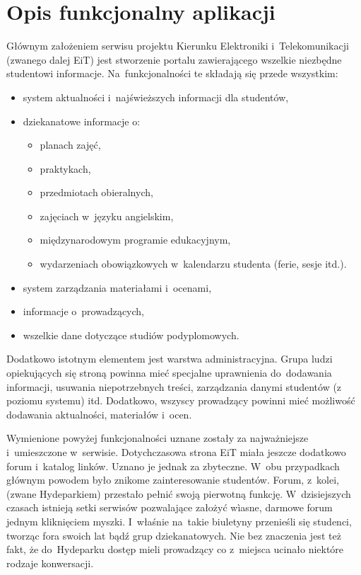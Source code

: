 \documentclass[a4paper,12pt,oneside]{report}
\begin{document}
\section{Opis funkcjonalny aplikacji}
\label{sec:funkcjonalny}
Głównym założeniem serwisu projektu Kierunku Elektroniki i~Telekomunikacji (zwanego dalej EiT) jest stworzenie portalu zawierającego wszelkie niezbędne studentowi informacje. Na~funkcjonalności te składają się przede wszystkim:
\begin{itemize}
  \item system aktualności i~najświeższych informacji dla studentów,
  \item dziekanatowe informacje o:
  \begin{itemize}
    \item planach zajęć,
    \item praktykach,
    \item przedmiotach obieralnych,
    \item zajęciach w~języku angielskim,
    \item międzynarodowym programie edukacyjnym,
    \item wydarzeniach obowiązkowych w~kalendarzu studenta (ferie, sesje itd.).
  \end{itemize}
  \item system zarządzania materiałami i~ocenami,
  \item informacje o~prowadzących,
  \item wszelkie dane dotyczące studiów podyplomowych.
\end{itemize}
Dodatkowo istotnym elementem jest warstwa administracyjna. Grupa ludzi opiekujących się stroną powinna mieć specjalne uprawnienia do~dodawania informacji, usuwania niepotrzebnych treści, zarządzania danymi studentów (z poziomu systemu) itd. Dodatkowo, wszyscy prowadzący powinni mieć możliwość dodawania aktualności, materiałów i~ocen. 

Wymienione powyżej funkcjonalności uznane zostały za najważniejsze i~umieszczone w~serwisie. Dotychczasowa strona EiT miała jeszcze dodatkowo forum i~katalog linków. Uznano je jednak za zbyteczne. W~obu przypadkach głównym powodem było znikome zainteresowanie studentów. Forum, z~kolei, (zwane Hydeparkiem) przestało pełnić swoją pierwotną funkcję. W~dzisiejszych czasach istnieją setki serwisów pozwalające założyć wìasne, darmowe forum jednym kliknięciem myszki. I~właśnie na~takie biuletyny przenieśli się studenci, tworząc fora swoich lat bądź grup dziekanatowych. Nie bez znaczenia jest też fakt, że do~Hydeparku dostęp mieli prowadzący co z~miejsca ucinało niektóre rodzaje konwersacji.
\end{document}
